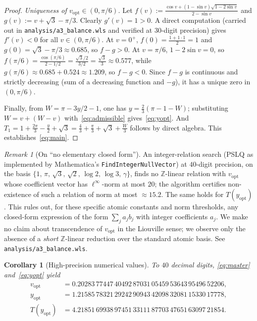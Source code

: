 \documentclass[11pt]{article}
\theoremstyle{plain}
\newtheorem{corollary}[theorem]{Corollary}
\theoremstyle{definition}
\theoremstyle{remark}
\newtheorem{remark}[theorem]{Remark}
\begin{document}
\begin{proof}
\emph{Uniqueness of $v_{\mathrm{opt}} \in (0, \pi/6)$.}
Let $f(v) := \tfrac{\cos v + (1 - \sin v)\sqrt{1 - 2\sin v}}{2 - \sin v}$
and $g(v) := v + \sqrt 3 - \pi/3$. Clearly $g'(v) = 1 > 0$. A direct
computation (carried out in \texttt{analysis/a3\_balance.wls} and
verified at 30-digit precision) gives $f'(v) < 0$ for all $v \in
(0, \pi/6)$. At $v = 0^+$, $f(0) = \tfrac{1 + 1\cdot 1}{2} = 1$ and
$g(0) = \sqrt 3 - \pi/3 \approx 0.685$, so $f - g > 0$. At $v = \pi/6$,
$1 - 2\sin v = 0$, so $f(\pi/6) = \tfrac{\cos(\pi/6)}{2 - 1/2} =
\tfrac{\sqrt 3/2}{3/2} = \tfrac{\sqrt 3}{3} \approx 0.577$, while
$g(\pi/6) \approx 0.685 + 0.524 \approx 1.209$, so $f - g < 0$. Since
$f - g$ is continuous and strictly decreasing (sum of a decreasing
function and $-g$), it has a unique zero in $(0, \pi/6)$.

Finally, from $W = \pi - 3y/2 - 1$, one has $y = \tfrac{2}{3}(\pi - 1 -
W)$; substituting $W = v + (W - v)$ with~\eqref{eq:admissible}
gives~\eqref{eq:yopt}. And $T_1 = 1 + \tfrac{2\pi}{3} - \tfrac{y}{2} +
\sqrt 3 = \tfrac{4}{3} + \tfrac{\pi}{3} + \sqrt 3 + \tfrac{W}{3}$ follows
by direct algebra. This establishes~\eqref{eq:main}.
\end{proof}

\begin{remark}[On ``no elementary closed form'']
\label{rem:pslq}
An integer-relation search (PSLQ as implemented by Mathematica's
\texttt{FindIntegerNullVector}) at $40$-digit precision, on the basis
$\{1,\, \pi,\, \sqrt 3,\, \sqrt 2,\, \log 2,\, \log 3,\, \gamma\}$,
finds no $\mathbb Z$-linear relation with $v_{\mathrm{opt}}$ whose
coefficient vector has $\ell^\infty$-norm at most $20$; the algorithm
certifies non-existence of such a relation of norm at most $\approx
15.2$. The same holds for $T(y_{\mathrm{opt}})$. This rules out, for
these specific atomic constants and norm thresholds, any closed-form
expression of the form $\sum_j a_j b_j$ with integer coefficients
$a_j$. We make no claim about transcendence of $v_{\mathrm{opt}}$ in the
Liouville sense; we observe only the absence of a \emph{short}
$\mathbb Z$-linear reduction over the standard atomic basis. See
\texttt{analysis/a3\_balance.wls}.
\end{remark}

\begin{corollary}[High-precision numerical values]
\label{cor:hp}
To $40$ decimal digits, \eqref{eq:master} and~\eqref{eq:yopt} yield
\[
\begin{aligned}
v_{\mathrm{opt}} &= 0.20283\,77447\,40492\,87031\,05459\,53643\,95496\,52206,\\
y_{\mathrm{opt}} &= 1.21585\,78321\,29242\,90943\,42098\,32081\,15330\,17778,\\
T(y_{\mathrm{opt}}) &= 4.21851\,69938\,97451\,33111\,87703\,47651\,63097\,21854.
\end{aligned}
\]
\end{corollary}
\end{document}
